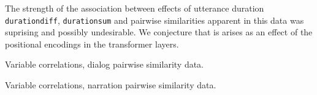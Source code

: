 

The strength of the association between effects of utterance
duration {\tt durationdiff}, {\tt durationsum} and pairwise similarities apparent in this
data was suprising and possibly undesirable. We conjecture that is
arises as an effect of the positional encodings in the transformer
layers.

\begin{table}
  \centering
  \begin{adjustbox}{angle=90}
    
  \end{adjustbox}
  \caption{Variable correlations, dialog pairwise similarity data.}
  \label{tab:dialogvarcor}
\end{table}
\begin{table}
  \centering
  \begin{adjustbox}{angle=90}
    
  \end{adjustbox}
  \caption{Variable correlations, narration pairwise similarity data.}
  \label{tab:narrationvarcor}
\end{table}
